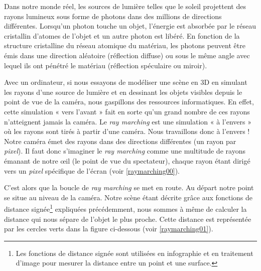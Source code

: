 Dans notre monde réel, les sources de lumière telles que le soleil projettent des rayons lumineux sous forme de photons dans des millions de directions différentes. Lorsqu'un photon touche un objet, l'énergie est absorbée par le réseau cristallin d'atomes de l'objet et un autre photon est libéré. En fonction de la structure cristalline du réseau atomique du matériau, les photons peuvent être émis dans une direction aléatoire (réflection diffuse) ou sous le même angle avec lequel ils ont pénétré le matériau (réflection spéculaire ou miroir).

Avec un ordinateur, si nous essayons de modéliser une scène en 3D en simulant les rayons d'une source de lumière et en dessinant les objets visibles depuis le point de vue de la caméra, nous gaspillons des ressources informatiques. En effet, cette simulation « vers l'avant » fait en sorte qu'un grand nombre de ces rayons n'atteignent jamais la caméra. Le \textit{ray marching} est une simulation « à l'envers » où les rayons sont tirés à partir d'une caméra. Nous travaillons donc à l'envers ! Notre caméra émet des rayons dans des directions différentes (un rayon par \textit{pixel}). Il faut donc s'imaginer le \textit{ray marching} comme une multitude de rayons émanant de notre œil (le point de vue du spectateur), chaque rayon étant dirigé vers un \textit{pixel} spécifique de l'écran (voir \ref{raymarching00}).

C'est alors que la boucle de  \textit{ray marching} se met en route. Au départ notre point se situe au niveau de la caméra. Notre scène étant décrite grâce aux fonctions de distance signée\footnote{Les fonctions de distance signée sont utilisées en infographie et en traitement d'image pour mesurer la distance entre un point et une surface.} expliquées précédemment, nous sommes à même de calculer la distance qui nous sépare de l'objet le plus proche. Cette distance est représentée par les cercles verts dans la figure ci-dessous (voir \ref{raymarching01}).

